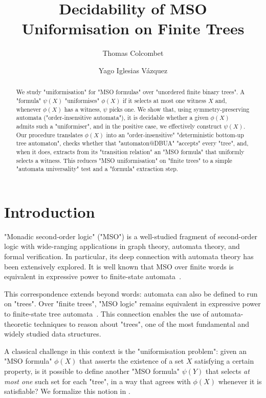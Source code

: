 \documentclass[a4paper,UKenglish,cleveref, autoref, thm-restate]{lipics-v2021}
\title{Decidability of MSO Uniformisation on Finite Trees}
\author{Thomas Colcombet}
	{CNRS, IRIF, Universit\'e Paris Diderot, France}
	{thomas.colcombet@irif.fr}
	{https://orcid.org/0000-0001-6529-6963}
	{}
\author{Yago Iglesias Vázquez}{Universit\'e Paris Diderot, France}{me@yagoiglesias.fr}{}{}
\begin{document}
\maketitle

\begin{abstract}
	We study "uniformisation" for "MSO formulas" over "unordered finite binary trees". A "formula" $\psi(X)$ "uniformises" $\phi(X)$
	if it selects at most one witness $X$ and, whenever $\phi(X)$ has a witness, $\psi$ picks one. We show that,
	using symmetry-preserving automata ("order-insensitive automata"), it is decidable whether a
	given $\phi(X)$ admits such a "uniformiser", and in the positive case, we effectively construct $\psi(X)$. Our procedure translates $\phi(X)$ into
	an "order-insensitive" "deterministic bottom-up tree automaton", checks whether that "automaton@DBUA" "accepts" every "tree", and, when
	it does, extracts from its "transition relation" an "MSO formula" that uniformly selects a witness. This reduces "MSO uniformisation"
	on "finite trees" to a simple "automata universality" test and a "formula" extraction step.
\end{abstract}

\tableofcontents
{}
\newpage
\section{Introduction}

"Monadic second‐order logic" ("MSO") is a well-studied fragment of second-order logic with wide-ranging applications in graph theory, automata theory, and formal verification.
In particular, its deep connection with automata theory has been extensively explored. It is well known that MSO over finite words is equivalent in expressive power to
finite-state automata~\cite{Buchi60}.

This correspondence extends beyond words: automata can also be defined to run on "trees". Over "finite trees", "MSO logic" remains equivalent in expressive power to finite-state
tree automata~\cite{TW68, Don70}. This connection enables the use of automata-theoretic techniques to reason about "trees", one of the most fundamental and widely studied data
structures.

A classical challenge in this context is the "uniformisation problem": given an "MSO formula" $\phi(X)$ that asserts the existence of a set $X$ satisfying a certain property,
is it possible to define another "MSO formula" $\psi(Y)$ that selects \emph{at most one} such set for each "tree", in a way that agrees with $\phi(X)$ whenever it is satisfiable? We
formalize this notion in .
\end{document}
